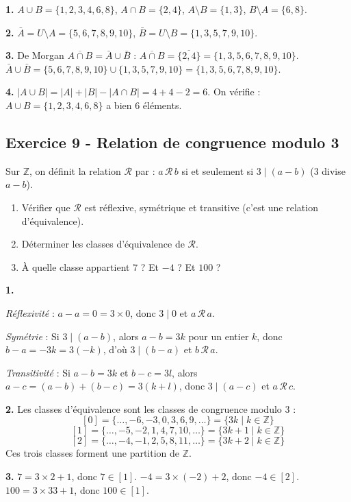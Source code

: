 \documentclass[12pt,a4paper]{article}
\begin{document}
\begin{boitecorrige}
\textbf{1.}
$A\cup B = \{1,2,3,4,6,8\}$,
$A\cap B = \{2,4\}$,
$A\setminus B = \{1,3\}$,
$B\setminus A = \{6,8\}$.

\textbf{2.}
$\bar{A} = U\setminus A = \{5,6,7,8,9,10\}$,
$\bar{B} = U\setminus B = \{1,3,5,7,9,10\}$.

\textbf{3.} De Morgan $\overline{A\cap B} = \bar{A}\cup\bar{B}$ :
$\overline{A\cap B} = \overline{\{2,4\}} = \{1,3,5,6,7,8,9,10\}$.
$\bar{A}\cup\bar{B} = \{5,6,7,8,9,10\}\cup\{1,3,5,7,9,10\} = \{1,3,5,6,7,8,9,10\}$.

\textbf{4.}
$|A\cup B| = |A| + |B| - |A\cap B| = 4 + 4 - 2 = 6$.
On vérifie : $A\cup B = \{1,2,3,4,6,8\}$ a bien 6 éléments.
\end{boitecorrige}

\subsection*{Exercice 9 - Relation de congruence modulo 3 \niveau{\moyen}}

\begin{boiteexercice}
Sur $\mathbb{Z}$, on définit la relation $\mathcal{R}$ par : $a\,\mathcal{R}\,b$ si et seulement si $3\mid(a-b)$ (3 divise $a-b$).
\begin{enumerate}
  \item Vérifier que $\mathcal{R}$ est réflexive, symétrique et transitive (c'est une relation d'équivalence).
  \item Déterminer les classes d'équivalence de $\mathcal{R}$.
  \item À quelle classe appartient $7$ ? Et $-4$ ? Et $100$ ?
\end{enumerate}
\end{boiteexercice}

\begin{boitecorrige}
\textbf{1.}

\textit{Réflexivité} : $a - a = 0 = 3\times0$, donc $3\mid0$ et $a\,\mathcal{R}\,a$.

\textit{Symétrie} : Si $3\mid(a-b)$, alors $a-b = 3k$ pour un entier $k$, donc $b-a = -3k = 3(-k)$, d'où $3\mid(b-a)$ et $b\,\mathcal{R}\,a$.

\textit{Transitivité} : Si $a-b = 3k$ et $b-c = 3l$, alors $a-c = (a-b)+(b-c) = 3(k+l)$, donc $3\mid(a-c)$ et $a\,\mathcal{R}\,c$.

\textbf{2.} Les classes d'équivalence sont les classes de congruence modulo 3 :
\[
[0] = \{\ldots,-6,-3,0,3,6,9,\ldots\} = \{3k \mid k\in\mathbb{Z}\}
\]
\[
[1] = \{\ldots,-5,-2,1,4,7,10,\ldots\} = \{3k+1 \mid k\in\mathbb{Z}\}
\]
\[
[2] = \{\ldots,-4,-1,2,5,8,11,\ldots\} = \{3k+2 \mid k\in\mathbb{Z}\}
\]
Ces trois classes forment une partition de $\mathbb{Z}$.

\textbf{3.}
$7 = 3\times2 + 1$, donc $7\in[1]$.
$-4 = 3\times(-2) + 2$, donc $-4\in[2]$.
$100 = 3\times33 + 1$, donc $100\in[1]$.
\end{boitecorrige}
\end{document}
